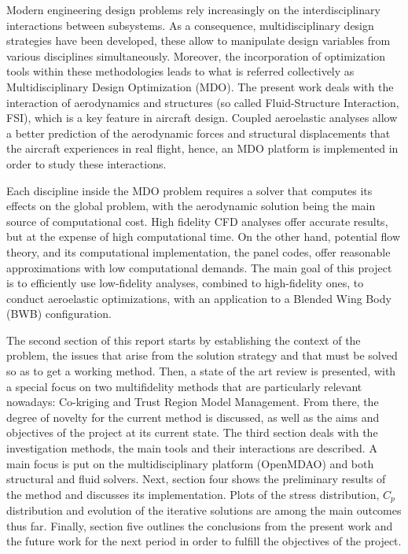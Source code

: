 Modern engineering design problems rely increasingly on the interdisciplinary interactions between subsystems. As a consequence, multidisciplinary design strategies have been developed, these allow to manipulate design variables from various disciplines simultaneously. Moreover, the incorporation of optimization tools within these methodologies leads to what is referred collectively as Multidisciplinary Design Optimization (MDO).    
The present work deals with the interaction of aerodynamics and structures (so called Fluid-Structure Interaction, FSI), which is a key feature in aircraft design. Coupled aeroelastic analyses allow a better prediction of the aerodynamic forces and structural displacements that the aircraft experiences in real flight, hence, an MDO platform is implemented in order to study these interactions. \par 
Each discipline inside the MDO problem requires a solver that computes its effects on the global problem, with the aerodynamic solution being the main source of computational cost. High fidelity CFD analyses offer accurate results, but at the expense of high computational time. On the other hand, potential flow theory, and its computational implementation, the panel codes, offer reasonable approximations with low computational demands. The main goal of this project is to efficiently use low-fidelity analyses, combined to high-fidelity ones, to conduct aeroelastic optimizations, with an application to a Blended Wing Body (BWB) configuration. \par
The second section of this report starts by establishing the context of the problem, the issues that arise from the solution strategy and that must be solved so as to get a working method. Then, a state of the art review is presented, with a special focus on two multifidelity methods that are particularly relevant nowadays: Co-kriging and Trust Region Model Management. From there, the degree of novelty for the current method is discussed, as well as the aims and objectives of the project at its current state. The third section deals with the investigation methods, the main tools and their interactions are described. A main focus is put on the multidisciplinary platform (OpenMDAO) and both structural and fluid solvers. Next, section four shows the preliminary results of the method and discusses its implementation. Plots of the stress distribution, $C_p$ distribution and evolution of the iterative solutions are among the main outcomes thus far.  Finally, section five outlines the conclusions from the present work and the future work for the next period in order to fulfill the objectives of the project. 

